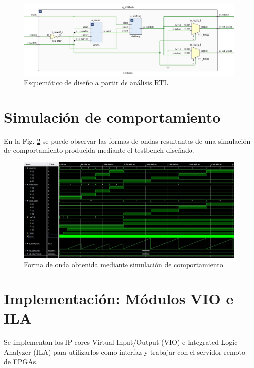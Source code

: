 \documentclass{article}
\begin{document}
\begin{figure}[ht]
    \centering
    \includegraphics[width=\textwidth]{rtl_schematic.jpg}
    \caption{Esquemático de diseño a partir de análisis RTL}
    \label{fig:rtl-schematic}
\end{figure}

\section*{Simulación de comportamiento}

En la Fig. \ref{fig:behavioral-sim} se puede observar las formas de ondas resultantes de una simulación de comportamiento producida mediante el testbench diseñado.

\begin{figure}[ht]
    \centering
    \includegraphics[width=\textwidth]{behavioral_sim.jpg}
    \caption{Forma de onda obtenida mediante simulación de comportamiento}
    \label{fig:behavioral-sim}
\end{figure}

\section*{Implementación: Módulos VIO e ILA}

Se implementan los IP cores Virtual Input/Output (VIO) e Integrated Logic Analyzer (ILA) para utilizarlos como interfaz y trabajar con el servidor remoto de FPGAs.
\end{document}
